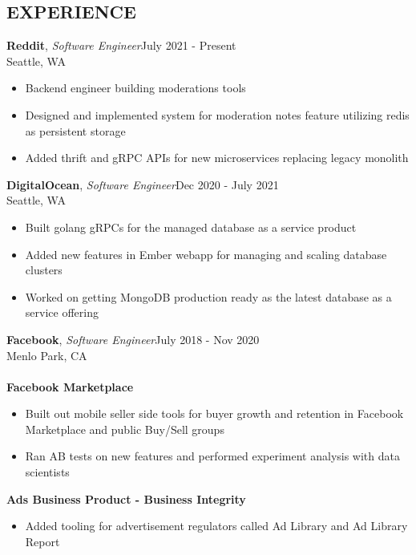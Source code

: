 \documentclass[line,margin]{res}
\begin{document}
\address{vinnyoodles@gmail.com}
\begin{resume}

	\section{EXPERIENCE}
		\textbf{Reddit}, {\sl Software Engineer}\hfill July 2021 - Present\\Seattle, WA\\
		\begin{itemize} \itemsep 1pt
			\item Backend engineer building moderations tools
			\item Designed and implemented system for moderation notes feature utilizing redis as persistent storage
			\item Added thrift and gRPC APIs for new microservices replacing legacy monolith
		\end{itemize}
		\textbf{DigitalOcean}, {\sl Software Engineer}\hfill Dec 2020 - July 2021\\Seattle, WA\\
		\begin{itemize} \itemsep 1pt
			\item Built golang gRPCs for the managed database as a service product
			\item Added new features in Ember webapp for managing and scaling database clusters
			\item Worked on getting MongoDB production ready as the latest database as a service offering
		\end{itemize}
		\textbf{Facebook}, {\sl Software Engineer}\hfill July 2018 - Nov 2020\\Menlo Park, CA\\
		\\ \textbf{Facebook Marketplace} 
		\begin{itemize} \itemsep 1pt 
			\item Built out mobile seller side tools for buyer growth and retention in Facebook Marketplace and public Buy/Sell groups
			\item Ran AB tests on new features and performed experiment analysis with data scientists
		\end{itemize}
		\textbf{Ads Business Product - Business Integrity} 
		\begin{itemize} \itemsep 1pt 
			\item Added tooling for advertisement regulators called Ad Library and Ad Library Report

\end{itemize}
\end{resume}
\end{document}
